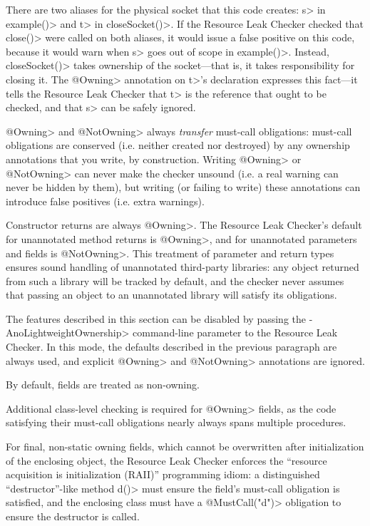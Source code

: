 There are two aliases for the physical socket that this code creates:
\<s> in \<example()> and \<t> in \<closeSocket()>.
If the Resource Leak Checker checked that \<close()> were
called on both aliases, it would issue a false positive on this
code, because it would warn when \<s>
goes out of scope in \<example()>.
Instead, \<closeSocket()> takes ownership of the socket---that is,
it takes responsibility for closing it. The \<@Owning> annotation
on \<t>'s declaration expresses this fact---it tells the Resource Leak
Checker that \<t> is the reference that ought to be checked, and that \<s>
can be safely ignored.

\<@Owning> and \<@NotOwning> always \emph{transfer} must-call obligations: must-call
obligations are conserved (i.e. neither created nor destroyed) by any ownership annotations
that you write, by construction. Writing \<@Owning> or \<@NotOwning> can never make the checker
unsound (i.e. a real warning can never be hidden by them),
but writing (or failing to write) these annotations can introduce false positives (i.e. extra warnings).

Constructor returns are always \<@Owning>.
The Resource Leak Checker's default for unannotated method returns is \<@Owning>,
and for unannotated parameters and fields is \<@NotOwning>. This treatment of parameter and
return types ensures sound handling of unannotated third-party libraries: any
object returned from such a library will be tracked by default, and the checker
never assumes that passing an object to an unannotated library will satisfy its obligations.

The features described in this section can be disabled by passing the \<-AnoLightweightOwnership>
command-line parameter to the Resource Leak Checker.
In this mode, the defaults described in the previous paragraph are always used, and explicit \<@Owning>
and \<@NotOwning> annotations are ignored.



By default, fields are treated as non-owning.

Additional class-level checking is required for \<@Owning>
fields, as the code
satisfying their must-call obligations nearly always spans multiple
procedures.

For final, non-static owning fields,
which cannot be overwritten after initialization of the enclosing
object, the Resource Leak Checker enforces the ``resource acquisition is
initialization (RAII)'' programming idiom: a distinguished
``destructor''-like method \<d()> must ensure the field's must-call obligation is
satisfied, and the enclosing class must have a \<@MustCall("d")> obligation to
ensure the destructor is called.

